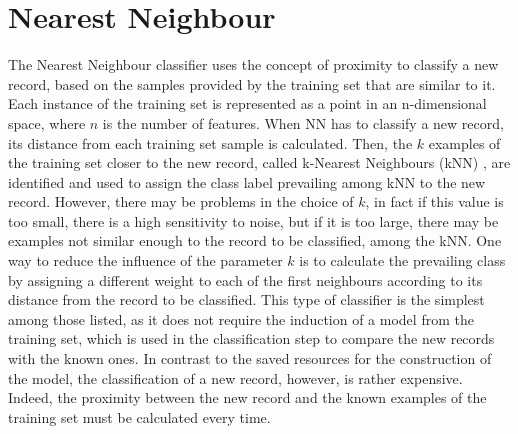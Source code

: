 \documentclass[final,a4paper,12pt,english]{UnicaPhdThesis3}
\begin{document}
\section{Nearest Neighbour} \label{kNN}
The Nearest Neighbour classifier uses the concept of proximity to classify a new record, based on the samples provided by the training set that are similar to it. Each instance of the training set is represented as a point in an n-dimensional space, where $n$ is the number of features. When NN has to classify a new record, its distance from each training set sample is calculated. Then, the $k$ examples of the training set closer to the new record, called k-Nearest Neighbours (k\acs{NN})  \cite{Cover}, are identified and used to assign the class label prevailing among kNN to the new record. However, there may be problems in the choice of $k$, in fact if this value is too small, there is a high sensitivity to noise, but if it is too large, there may be examples not similar enough to the record to be classified, among the kNN. One way to reduce the influence of the parameter $k$ is to calculate the prevailing class by assigning a different weight to each of the first neighbours according to its distance from the record to be classified. This type of classifier is the simplest among those listed, as it does not require the induction of a model from the training set, which is used in the classification step to compare the new records with the known ones. In contrast to the saved resources for the construction of the model, the classification of a new record, however, is rather expensive. Indeed, the proximity between the new record and the known examples of the training set must be calculated every time.
\end{document}
